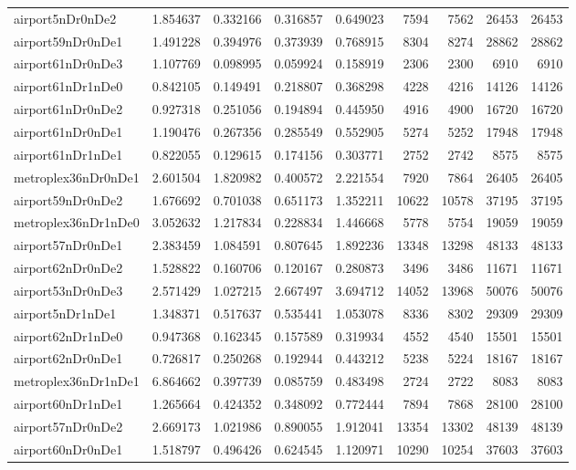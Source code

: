 \begin{longtable}{|l|r|r|r|r|r|r|r|r|}
airport5nDr0nDe2 & 1.854637 & 0.332166 & 0.316857 & 0.649023 & 7594 & 7562 & 26453 & 26453 \\
airport59nDr0nDe1 & 1.491228 & 0.394976 & 0.373939 & 0.768915 & 8304 & 8274 & 28862 & 28862 \\
airport61nDr0nDe3 & 1.107769 & 0.098995 & 0.059924 & 0.158919 & 2306 & 2300 & 6910 & 6910 \\
airport61nDr1nDe0 & 0.842105 & 0.149491 & 0.218807 & 0.368298 & 4228 & 4216 & 14126 & 14126 \\
airport61nDr0nDe2 & 0.927318 & 0.251056 & 0.194894 & 0.445950 & 4916 & 4900 & 16720 & 16720 \\
airport61nDr0nDe1 & 1.190476 & 0.267356 & 0.285549 & 0.552905 & 5274 & 5252 & 17948 & 17948 \\
airport61nDr1nDe1 & 0.822055 & 0.129615 & 0.174156 & 0.303771 & 2752 & 2742 & 8575 & 8575 \\
metroplex36nDr0nDe1 & 2.601504 & 1.820982 & 0.400572 & 2.221554 & 7920 & 7864 & 26405 & 26405 \\
airport59nDr0nDe2 & 1.676692 & 0.701038 & 0.651173 & 1.352211 & 10622 & 10578 & 37195 & 37195 \\
metroplex36nDr1nDe0 & 3.052632 & 1.217834 & 0.228834 & 1.446668 & 5778 & 5754 & 19059 & 19059 \\
airport57nDr0nDe1 & 2.383459 & 1.084591 & 0.807645 & 1.892236 & 13348 & 13298 & 48133 & 48133 \\
airport62nDr0nDe2 & 1.528822 & 0.160706 & 0.120167 & 0.280873 & 3496 & 3486 & 11671 & 11671 \\
airport53nDr0nDe3 & 2.571429 & 1.027215 & 2.667497 & 3.694712 & 14052 & 13968 & 50076 & 50076 \\
airport5nDr1nDe1 & 1.348371 & 0.517637 & 0.535441 & 1.053078 & 8336 & 8302 & 29309 & 29309 \\
airport62nDr1nDe0 & 0.947368 & 0.162345 & 0.157589 & 0.319934 & 4552 & 4540 & 15501 & 15501 \\
airport62nDr0nDe1 & 0.726817 & 0.250268 & 0.192944 & 0.443212 & 5238 & 5224 & 18167 & 18167 \\
metroplex36nDr1nDe1 & 6.864662 & 0.397739 & 0.085759 & 0.483498 & 2724 & 2722 & 8083 & 8083 \\
airport60nDr1nDe1 & 1.265664 & 0.424352 & 0.348092 & 0.772444 & 7894 & 7868 & 28100 & 28100 \\
airport57nDr0nDe2 & 2.669173 & 1.021986 & 0.890055 & 1.912041 & 13354 & 13302 & 48139 & 48139 \\
airport60nDr0nDe1 & 1.518797 & 0.496426 & 0.624545 & 1.120971 & 10290 & 10254 & 37603 & 37603 \\

\end{longtable}
